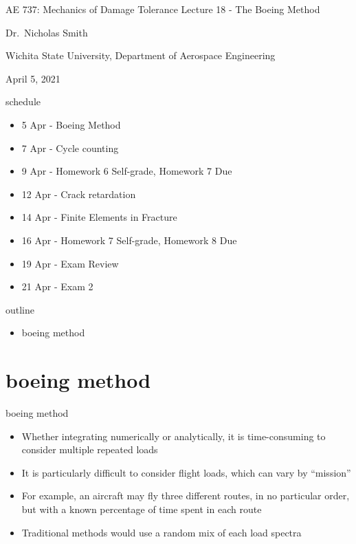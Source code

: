 \documentclass[
  letterpaper,
  ignorenonframetext,
  aspectratio=43,
  handout,
  12pt]{beamer}
\author{}
\date{}
\providecommand{\tightlist}{%
  \setlength{\itemsep}{0pt}\setlength{\parskip}{0pt}}
\providecommand{\tightlist}{%
\setlength{\itemsep}{0pt}\setlength{\parskip}{0pt}}
\begin{document}
\begin{frame}{AE 737: Mechanics of Damage Tolerance}
\protect\hypertarget{ae-737-mechanics-of-damage-tolerance}{}
Lecture 18 - The Boeing Method

Dr.~Nicholas Smith

Wichita State University, Department of Aerospace Engineering

April 5, 2021
\end{frame}

\begin{frame}{schedule}
\protect\hypertarget{schedule}{}
\begin{itemize}
\tightlist
\item
  5 Apr - Boeing Method
\item
  7 Apr - Cycle counting
\item
  9 Apr - Homework 6 Self-grade, Homework 7 Due
\item
  12 Apr - Crack retardation
\item
  14 Apr - Finite Elements in Fracture
\item
  16 Apr - Homework 7 Self-grade, Homework 8 Due
\item
  19 Apr - Exam Review
\item
  21 Apr - Exam 2
\end{itemize}
\end{frame}

\begin{frame}{outline}
\protect\hypertarget{outline}{}
\begin{itemize}
\tightlist
\item
  boeing method
\end{itemize}
\end{frame}

\hypertarget{boeing-method}{%
\section{boeing method}\label{boeing-method}}

\begin{frame}{boeing method}
\protect\hypertarget{boeing-method-1}{}
\begin{itemize}
\tightlist
\item
  Whether integrating numerically or analytically, it is time-consuming
  to consider multiple repeated loads
\item
  It is particularly difficult to consider flight loads, which can vary
  by ``mission''
\item
  For example, an aircraft may fly three different routes, in no
  particular order, but with a known percentage of time spent in each
  route
\item
  Traditional methods would use a random mix of each load spectra
\end{itemize}
\end{frame}
\end{document}

